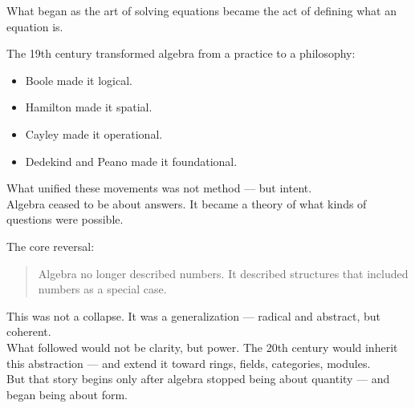 \documentclass[9pt]{article}
\begin{document}
What began as the art of solving equations  
became the act of defining what an equation is.\\

\bigskip

The 19th century transformed algebra from a practice to a philosophy:
\begin{itemize}
  \item Boole made it logical.
  \item Hamilton made it spatial.
  \item Cayley made it operational.
  \item Dedekind and Peano made it foundational.
\end{itemize}

What unified these movements was not method — but intent.\\

Algebra ceased to be about answers.  
It became a theory of what kinds of questions were possible.\\

\bigskip

The core reversal:\\
\begin{quote}
Algebra no longer described numbers.  
It described structures that included numbers as a special case.
\end{quote}

This was not a collapse.  
It was a generalization — radical and abstract, but coherent.\\

What followed would not be clarity, but power.  
The 20th century would inherit this abstraction — and extend it toward rings, fields, categories, modules.\\

But that story begins only after algebra stopped being about quantity —  
and began being about form.\\
\end{document}
